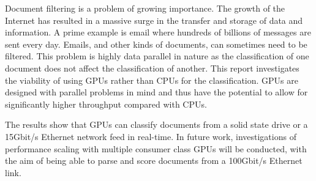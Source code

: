 Document filtering is a problem of growing importance. The growth of the
Internet has resulted in a massive surge in the transfer and storage of data and
information. A prime example is email where hundreds of billions of messages
are sent every day. Emails, and other kinds of documents, can sometimes need to
be filtered. This problem is highly data parallel in nature as the
classification of one document does not affect the classification of another.
This report investigates the viability of using GPUs rather than CPUs for the
classification. GPUs are designed with parallel problems in mind and thus have
the potential to allow for significantly higher throughput compared with CPUs.

The results show that GPUs can classify documents from a solid state drive or a
15Gbit/s Ethernet network feed in real-time. In future work, investigations of
performance scaling with multiple consumer class GPUs will be conducted, with
the aim of being able to parse and score documents from a 100Gbit/s Ethernet
link.

